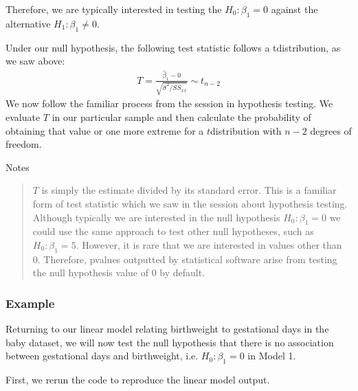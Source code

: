 \documentclass[letterpaper,10pt,english]{jupyterBook}
\begin{document}
\sphinxAtStartPar
Therefore, we are typically interested in testing the  \(H_0: \beta_1=0\) against the alternative \(H_1: \beta_1 \neq 0\).

\sphinxAtStartPar
Under our null hypothesis, the following test statistic follows a t\sphinxhyphen{}distribution, as we saw above:
\begin{equation*}
\begin{split}
T = \frac{\hat{\beta}_1 - 0}{\sqrt{\hat{\sigma}^2/SS_{xx}}} \sim t_{n-2}
\end{split}
\end{equation*}
\sphinxAtStartPar
We now follow the familiar process from the session in hypothesis testing. We evaluate \(T\) in our particular sample and then calculate the probability of obtaining that value or one more extreme for a \(t\)\sphinxhyphen{}distribution with \(n-2\) degrees of freedom.

\sphinxAtStartPar
Notes
\begin{quote}

\sphinxAtStartPar
\(T\) is simply the estimate divided by its standard error. This is a familiar form of test statistic which we saw in the session about hypothesis testing.   
Although typically we are interested in the null hypothesis \(H_0: \beta_1=0\) we could use the same approach to test other null hypotheses, such as \(H_0: \beta_1=5\). However, it is rare that we are interested in values other than 0. Therefore, p\sphinxhyphen{}values outputted by statistical software arise from testing the null hypothesis value of 0 by default.
\end{quote}


\subsubsection{Example}
\label{\detokenize{12.g. Linear Regression I:example}}
\sphinxAtStartPar
Returning to our linear model relating birthweight to gestational days in the baby dataset, we will now test the null hypothesis that there is no association between gestational days and birthweight, i.e. \(H_0: \beta_1 = 0\) in Model 1.

\sphinxAtStartPar
First, we rerun the code to reproduce the linear model output.

\begin{sphinxVerbatim}[commandchars=\\\{\}]
 
 
\end{sphinxVerbatim}
\end{document}
